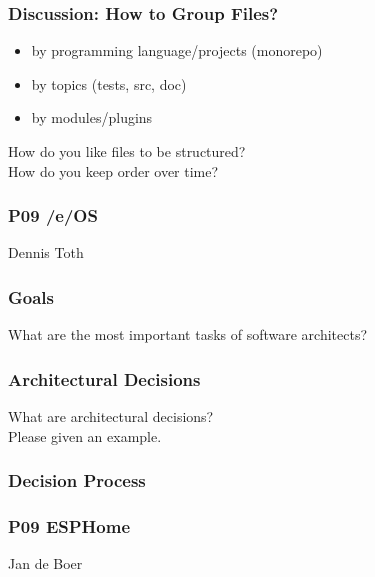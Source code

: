 
\begin{assignment}
	\frametitle{Discussion: How to Group Files?}

	\begin{itemize}
	\item by programming language/projects (monorepo)
	\item by topics (tests, src, doc)
	\item by modules/plugins
	\end{itemize}

	\begin{task}
	How do you like files to be structured? \\
	How do you keep order over time?
	\end{task}
\end{assignment}

\breakframe

\begin{frame}
	\frametitle{P09 /e/OS}

	Dennis Toth
\end{frame}


\begin{assignment}
	\frametitle{Goals}

	\begin{task}
	What are the most important tasks of software architects?
	\end{task}
\end{assignment}


\begin{assignment}
	\frametitle{Architectural Decisions}

	\begin{task}
	What are architectural decisions? \\
	Please given an example.
	\end{task}
\end{assignment}


\begin{assignment}
	\frametitle{Decision Process}
\end{assignment}

\breakframe

\begin{frame}
	\frametitle{P09 ESPHome}

	Jan de Boer
\end{frame}


